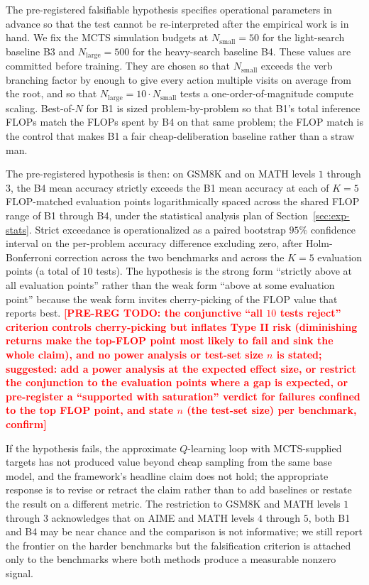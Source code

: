 The pre-registered falsifiable hypothesis specifies operational
parameters in advance so that the test cannot be re-interpreted after
the empirical work is in hand. We fix the MCTS simulation budgets at
$N_{\mathrm{small}} = 50$ for the light-search baseline B3 and
$N_{\mathrm{large}} = 500$ for the heavy-search baseline B4. These
values are committed before training. They are chosen so that
$N_{\mathrm{small}}$ exceeds the verb branching factor by enough
to give every action multiple visits on average from the root, and so
that $N_{\mathrm{large}} = 10 \cdot N_{\mathrm{small}}$ tests a
one-order-of-magnitude compute scaling. Best-of-$N$ for B1 is sized
problem-by-problem so that B1's total inference FLOPs match the FLOPs
spent by B4 on that same problem; the FLOP match is the
control that makes B1 a fair cheap-deliberation baseline rather than a
straw man.

The pre-registered hypothesis is then: on GSM8K and on MATH levels $1$
through $3$, the B4 mean accuracy strictly exceeds the B1 mean accuracy
at each of $K = 5$ FLOP-matched evaluation points logarithmically
spaced across the shared FLOP range of B1 through B4, under the
statistical analysis plan of Section~\ref{sec:exp-stats}. Strict
exceedance is operationalized as a paired bootstrap $95\%$ confidence
interval on the per-problem accuracy difference excluding zero, after
Holm-Bonferroni correction across the two benchmarks and across the
$K = 5$ evaluation points (a total of $10$ tests). The hypothesis is
the strong form ``strictly above at all evaluation points'' rather
than the weak form ``above at some evaluation point'' because the weak
form invites cherry-picking of the FLOP value that reports best.
\textcolor{red}{\textbf{[PRE-REG TODO: the conjunctive ``all $10$ tests
reject'' criterion controls cherry-picking but inflates Type II risk
(diminishing returns make the top-FLOP point most likely to fail and
sink the whole claim), and no power analysis or test-set size $n$ is
stated; suggested: add a power analysis at the expected effect size, or
restrict the conjunction to the evaluation points where a gap is
expected, or pre-register a ``supported with saturation'' verdict for
failures confined to the top FLOP point, and state $n$ (the test-set
size) per benchmark, confirm]}}

If the hypothesis fails, the approximate $Q$-learning loop with
MCTS-supplied targets has not produced value beyond cheap sampling
from the same base model, and the framework's headline claim does not
hold; the appropriate response is to revise or retract the claim
rather than to add baselines or restate the result on a different
metric. The restriction to GSM8K and MATH levels $1$ through $3$
acknowledges that on AIME and MATH levels $4$ through $5$, both B1
and B4 may be near chance and the comparison is not informative; we
still report the frontier on the harder benchmarks but the
falsification criterion is attached only to the benchmarks where both
methods produce a measurable nonzero signal.

